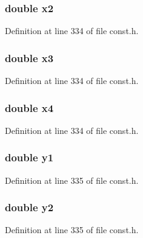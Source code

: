 \subsubsection[{x2}]{\setlength{\rightskip}{0pt plus 5cm}double x2}\label{structcondsq_adcf04f5f1964d18b332643939561da0d}


Definition at line 334 of file const.\+h.

\hypertarget{structcondsq_a98e99f64ddf7321e4eae52beca4b580f}{}
\subsubsection[{x3}]{\setlength{\rightskip}{0pt plus 5cm}double x3}\label{structcondsq_a98e99f64ddf7321e4eae52beca4b580f}


Definition at line 334 of file const.\+h.

\hypertarget{structcondsq_aeeabbbab3ba9e1ce2ac2251cb07158cc}{}
\subsubsection[{x4}]{\setlength{\rightskip}{0pt plus 5cm}double x4}\label{structcondsq_aeeabbbab3ba9e1ce2ac2251cb07158cc}


Definition at line 334 of file const.\+h.

\hypertarget{structcondsq_ac3b72e5b77595ca2340ecf8ccfe5fd99}{}
\subsubsection[{y1}]{\setlength{\rightskip}{0pt plus 5cm}double y1}\label{structcondsq_ac3b72e5b77595ca2340ecf8ccfe5fd99}


Definition at line 335 of file const.\+h.

\hypertarget{structcondsq_a5347e514ebe985fb371754ffd2b5ff83}{}
\subsubsection[{y2}]{\setlength{\rightskip}{0pt plus 5cm}double y2}\label{structcondsq_a5347e514ebe985fb371754ffd2b5ff83}


Definition at line 335 of file const.\+h.

\hypertarget{structcondsq_a786634d3d364cf94d8eb600ce7136355}{}
